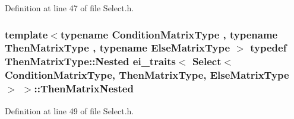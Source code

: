 Definition at line 47 of file Select.\-h.

\hypertarget{structei__traits_3_01_select_3_01_condition_matrix_type_00_01_then_matrix_type_00_01_else_matrix_type_01_4_01_4_a3c3cae49aa15de90b2f6d778b58a9878}{
\subsubsection[{Then\-Matrix\-Nested}]{\setlength{\rightskip}{0pt plus 5cm}template$<$typename Condition\-Matrix\-Type , typename Then\-Matrix\-Type , typename Else\-Matrix\-Type $>$ typedef Then\-Matrix\-Type\-::\-Nested {\bf ei\-\_\-traits}$<$ {\bf Select}$<$ Condition\-Matrix\-Type, Then\-Matrix\-Type, Else\-Matrix\-Type $>$ $>$\-::{\bf Then\-Matrix\-Nested}}}\label{structei__traits_3_01_select_3_01_condition_matrix_type_00_01_then_matrix_type_00_01_else_matrix_type_01_4_01_4_a3c3cae49aa15de90b2f6d778b58a9878}


Definition at line 49 of file Select.\-h.




